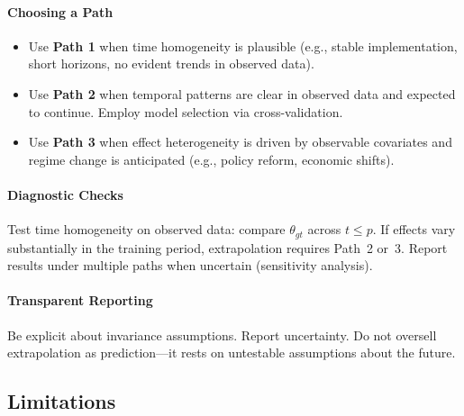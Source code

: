 \documentclass{article}
\begin{document}

\paragraph{Choosing a Path}

\begin{itemize}
\item Use \textbf{Path 1} when time homogeneity is plausible (e.g., stable implementation, short horizons, no evident trends in observed data).
\item Use \textbf{Path 2} when temporal patterns are clear in observed data and expected to continue. Employ model selection via cross-validation.
\item Use \textbf{Path 3} when effect heterogeneity is driven by observable covariates and regime change is anticipated (e.g., policy reform, economic shifts).
\end{itemize}

\paragraph{Diagnostic Checks}

Test time homogeneity on observed data: compare $\theta_{gt}$ across $t \leq p$. If effects vary substantially in the training period, extrapolation requires Path~2 or~3. Report results under multiple paths when uncertain (sensitivity analysis).

\paragraph{Transparent Reporting}

Be explicit about invariance assumptions. Report uncertainty. Do not oversell extrapolation as prediction---it rests on untestable assumptions about the future.

\subsection{Limitations}

\end{document}
